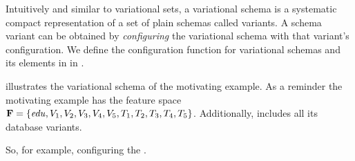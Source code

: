 Intuitively and similar to variational sets, a variational schema is a systematic  
compact representation of a set of plain schemas called variants.
A schema variant can be obtained 
by \emph{configuring} the variational schema with that variant's configuration.
We define the configuration function for variational schemas and its elements in  in .

\begin{example}
\label{eg:vsch-mot}
 illustrates the variational schema of the motivating example. 
As a reminder the motivating example has the feature space $\fSet = \setDef {\edu,
\vOne, \vTwo, \vThree, \vFour, \vFive, \tOne, \tTwo, \tThree, \tFour, \tFive}$. Additionally,
 includes all its database variants. 

So, for example, configuring the .
\end{example}

